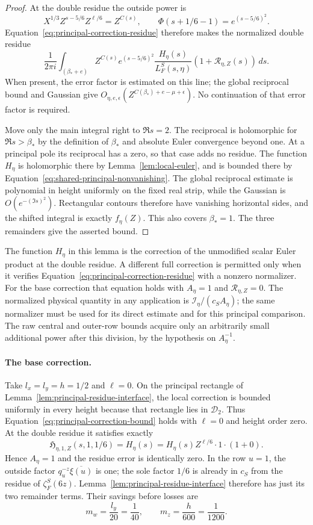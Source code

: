 \documentclass[11pt,a4paper]{article}
\numberwithin{equation}{section}
\numberwithin{figure}{section}
\theoremstyle{definition}
\theoremstyle{remark}
\begin{document}
\begin{proof}
At the double residue the outside power is
\[
 X^{1/3}Z^{s-5/6}Z^{\ell/6}=Z^{C(s)},
 \qquad \Phi(s+1/6-1)=e^{(s-5/6)^2}.
\]
Equation~\eqref{eq:principal-correction-residue} therefore makes the
normalized double residue
\[
 \frac1{2\pi i}\int_{(\beta_*+e)}
 Z^{C(s)}e^{(s-5/6)^2}\frac{H_\eta(s)}{L_F^S(s,\eta)}
          (1+\mathcal R_{\eta,Z}(s))\,ds.
\]
When present, the error factor is estimated on this line; the global
reciprocal bound and Gaussian give
$O_{\eta,e,\epsilon}(Z^{C(\beta_*)+e-\mu+\epsilon})$.
No continuation of that error factor is required.

Move only the main integral right to $\Re s=2$.  The reciprocal is
holomorphic for $\Re s>\beta_*$ by the definition of $\beta_*$ and
absolute Euler convergence beyond one.  At a principal pole its reciprocal
has a zero, so that case adds no residue.  The function $H_\eta$ is
holomorphic there by Lemma~\ref{lem:local-euler}, and is bounded there by
Equation~\eqref{eq:shared-principal-nonvanishing}.  The global reciprocal
estimate is polynomial in
height uniformly on the fixed real strip, while the Gaussian is
$O(e^{-(\Im s)^2})$.  Rectangular contours therefore have vanishing
horizontal sides, and the shifted integral is exactly $f_\eta(Z)$.
This also covers $\beta_*=1$.  The three remainders give the asserted bound.
\end{proof}

The function $H_\eta$ in this lemma is the correction of the unmodified
scalar Euler product at the double residue.  A different full correction
is permitted only when it verifies
Equation~\eqref{eq:principal-correction-residue} with a nonzero normalizer.
For the base correction that equation holds with $A_\eta=1$ and
$\mathcal R_{\eta,Z}=0$.  The normalized physical quantity in any
application is $\mathscr I_\eta/(c_SA_\eta)$; the same normalizer must be
used for its direct estimate and for this principal comparison.  The raw
central and outer-row bounds acquire only an arbitrarily small additional
power after this division, by the hypothesis on $A_\eta^{-1}$.

\paragraph{The base correction.}

Take $l_x=l_y=h=1/2$ and $\ell=0$.  On the principal rectangle of Lemma~\ref{lem:principal-residue-interface},
the local correction is bounded uniformly in every height because that
rectangle lies in $\mathcal D_2$.  Thus
Equation~\eqref{eq:principal-correction-bound} holds with $\ell=0$ and
height order zero.  At the double residue it satisfies exactly
\[
 \mathfrak H_{\eta,1,Z}(s,1,1/6)=H_\eta(s)
       =H_\eta(s)Z^{\ell/6}\cdot1\cdot(1+0).
\]
Hence $A_\eta=1$ and the residue error is identically zero.  In the row
$u=1$, the outside factor $q_u^{-z}\overline{\xi(u)}$ is one; the sole
factor $1/6$ is already in $c_S$ from the residue of $\zeta_F^S(6z)$.
Lemma~\ref{lem:principal-residue-interface} therefore has just its two
remainder terms.  Their savings before losses are
\[
 m_w=\frac{l_y}{20}=\frac1{40},\qquad
 m_z=\frac h{600}=\frac1{1200}.
\]
\end{document}
